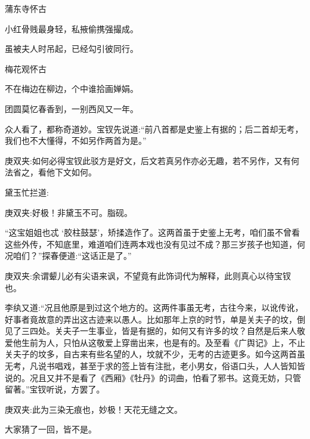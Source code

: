 \begin{poem}
    \emptypl
    \begin{pl}蒲东寺怀古　\end{pl}

    \begin{pl}小红骨贱最身轻，私掖偷携强撮成。\end{pl}

    \begin{pl}虽被夫人时吊起，已经勾引彼同行。\end{pl}

    \emptypl
    \begin{pl}梅花观怀古　\end{pl}

    \begin{pl}不在梅边在柳边，个中谁拾画婵娟。\end{pl}

    \begin{pl}团圆莫忆春香到，一别西风又一年。\end{pl}

\end{poem}


\begin{parag}
    众人看了，都称奇道妙。宝钗先说道:“前八首都是史鉴上有据的；后二首却无考，我们也不大懂得，不如另作两首为是。”\begin{note}庚双夹:如何必得宝钗此驳方是好文，后文若真另作亦必无趣，若不另作，又有何法省之，看他下文如何。\end{note}黛玉忙拦道:\begin{note}庚双夹:好极！非黛玉不可。脂砚。\end{note}“这宝姐姐也忒 ‘胶柱鼓瑟’，矫揉造作了。这两首虽于史鉴上无考，咱们虽不曾看这些外传，不知底里，难道咱们连两本戏也没有见过不成？那三岁孩子也知道，何况咱们？”探春便道:“这话正是了。”\begin{note}庚双夹:余谓颦儿必有尖语来讽，不望竟有此饰词代为解释，此则真心以待宝钗也。\end{note}李纨又道:“况且他原是到过这个地方的。这两件事虽无考，古往今来，以讹传讹，好事者竟故意的弄出这古迹来以愚人。比如那年上京的时节，单是关夫子的坟，倒见了三四处。关夫子一生事业，皆是有据的，如何又有许多的坟？自然是后来人敬爱他生前为人，只怕从这敬爱上穿凿出来，也是有的。及至看《广舆记》上，不止关夫子的坟多，自古来有些名望的人，坟就不少，无考的古迹更多。如今这两首虽无考，凡说书唱戏，甚至于求的签上皆有注批，老小男女，俗语口头，人人皆知皆说的。况且又并不是看了《西厢》《牡丹》的词曲，怕看了邪书。这竟无妨，只管留著。”宝钗听说，方罢了。\begin{note}庚双夹:此为三染无痕也，妙极！天花无缝之文。\end{note}大家猜了一回，皆不是。
\end{parag}


